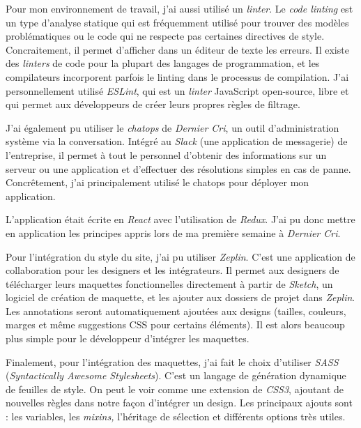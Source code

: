 \documentclass[12pt,a4paper]{article}
\begin{document}
  \bigskip

  Pour mon environnement de travail, j'ai aussi utilisé un \emph{linter}.
  Le \emph{code linting} est un type d'analyse statique qui est
  fréquemment utilisé pour trouver des modèles problématiques ou le code
  qui ne respecte pas certaines directives de style. Concraitement, il
  permet d'afficher dans un éditeur de texte les erreurs. Il existe des
  \emph{linters} de code pour la plupart des langages de programmation, et
  les compilateurs incorporent parfois le linting dans le processus de
  compilation. J'ai personnellement utilisé \emph{ESLint}, qui est un
  \emph{linter} JavaScript open-source, libre et qui permet aux
  développeurs de créer leurs propres règles de filtrage.

  \bigskip

  J'ai également pu utiliser le \emph{chatops} de \emph{Dernier Cri}, un
  outil d'administration système via la conversation. Intégré au
  \emph{Slack} (une application de messagerie) de l'entreprise, il permet
  à tout le personnel d'obtenir des informations sur un serveur ou une
  application et d'effectuer des résolutions simples en cas de panne.
  Concrêtement, j'ai principalement utilisé le chatops pour déployer mon
  application.

  \bigskip

  L'application était écrite en \emph{React} avec l'utilisation de
  \emph{Redux}. J'ai pu donc mettre en application les principes appris
  lors de ma première semaine à \emph{Dernier Cri}.

  \bigskip

  Pour l'intégration du style du site, j'ai pu utiliser \emph{Zeplin}.
  C'est une application de collaboration pour les designers et les
  intégrateurs. Il permet aux designers de télécharger leurs maquettes
  fonctionnelles directement à partir de \emph{Sketch}, un logiciel de
  création de maquette, et les ajouter aux dossiers de projet dans
  \emph{Zeplin}. Les annotations seront automatiquement ajoutées aux
  designs (tailles, couleurs, marges et même suggestions CSS pour certains
  éléments). Il est alors beaucoup plus simple pour le développeur
  d'intégrer les maquettes.

  \bigskip

  Finalement, pour l'intégration des maquettes, j'ai fait le choix
  d'utiliser \emph{SASS} (\emph{Syntactically Awesome Stylesheets}). C'est
  un langage de génération dynamique de feuilles de style. On peut le voir
  comme une extension de \emph{CSS3}, ajoutant de nouvelles règles dans
  notre façon d'intégrer un design. Les principaux ajouts sont : les
  variables, les \emph{mixins,} l'héritage de sélection et différents
  options très utiles.
\end{document}
